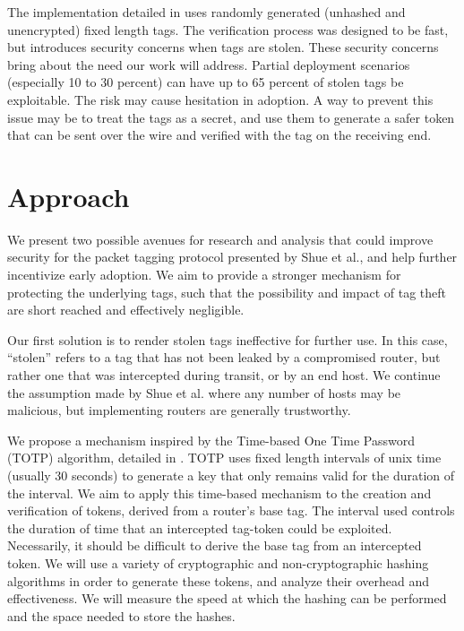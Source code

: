 \documentclass[12pt]{article} %
\begin{document}
	The implementation detailed in \cite{Shue20081567} uses randomly generated (unhashed and unencrypted) fixed length tags. The verification process was designed to be fast, but introduces security concerns when tags are stolen. These security concerns bring about the need our work will address. Partial deployment scenarios (especially 10 to 30 percent) can have up to 65 percent of stolen tags be exploitable. The risk may cause hesitation in adoption. A way to prevent this issue may be to treat the tags as a secret, and use them to generate a safer token that can be sent over the wire and verified with the tag on the receiving end.

\section{Approach}
	We present two possible avenues for research and analysis that could improve security for the packet tagging protocol presented by Shue et al., and help further incentivize early adoption. We aim to provide a stronger mechanism for protecting the underlying tags, such that the possibility and impact of tag theft are short reached and effectively negligible.

	Our first solution is to render stolen tags ineffective for further use. In this case, ``stolen'' refers to a tag that has not been leaked by a compromised router, but rather one that was intercepted during transit, or by an end host. We continue the assumption made by Shue et al. where any number of hosts may be malicious, but implementing routers are generally trustworthy. 

	We propose a mechanism inspired by the Time-based One Time Password (TOTP) algorithm, detailed in \cite{rfc6238}. TOTP uses fixed length intervals of unix time (usually 30 seconds) to generate a key that only remains valid for the duration of the interval. We aim to apply this time-based mechanism to the creation and verification of tokens, derived from a router's base tag. The interval used controls the duration of time that an intercepted tag-token could be exploited. Necessarily, it should be difficult to derive the base tag from an intercepted token. We will use a variety of cryptographic and non-cryptographic hashing algorithms in order to generate these tokens, and analyze their overhead and effectiveness. We will measure the speed at which the hashing can be performed and the space needed to store the hashes.
\end{document}
